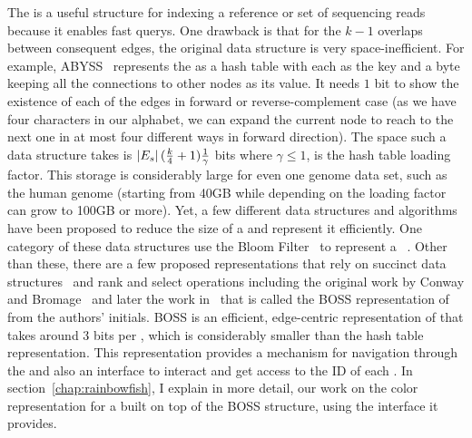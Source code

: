The \dbg is a useful structure for indexing a reference or set of sequencing reads
because it enables fast querys.
One drawback is that for the $k-1$ overlaps between consequent edges,
the original data structure is very space-inefficient. For example,
ABYSS~\cite{simpson2009abyss} represents the \dbg as a hash table with each \kmer
as the key and a byte keeping all the connections to other nodes as its value.
It needs $1$ bit to show the existence of each of the edges in forward or reverse-complement case
(as we have four characters in our alphabet, we can expand the current node
to reach to the next one in at most four different ways in forward direction).
The space such a data structure takes is $\left|E_s\right|(\frac{k}{4}+1)\frac{1}{\gamma}$ bits
where $\gamma \leq 1$, is the hash table loading factor.
This storage is considerably large for even one genome data set,
such as the human genome (starting from 40GB while depending on the loading factor can grow to 100GB or more).
Yet, a few different data structures and algorithms have been proposed to reduce the size of a \dbg
and represent it efficiently. One category of these data structures use the Bloom Filter~\cite{}
to represent a \dbg~\cite{pell2012scaling,salikhov2013using,chikhi2012space,chikhi2013space,holley2016bloom}.
Other than these, there are a few proposed representations
that rely on succinct data structures~\cite{gbmp2014sea}
and rank and select operations including the original work by Conway and Bromage~\cite{conway2011succinct}
and later the work in~\cite{BoweOn12} that is called the BOSS representation of \dbg from the authors’ initials.
BOSS is an efficient, edge-centric representation of \dbg that takes around 3 bits per \kmer,
which is considerably smaller than the hash table representation.
This representation provides a mechanism for navigation through the \dbg
and also an interface to interact and get access to the ID of each \kmer.
In section~\ref{chap:rainbowfish}, I explain in more detail, our work on the color representation
for a \dbg built on top of the BOSS structure, using the interface it provides.


